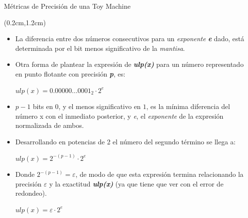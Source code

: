 \documentclass[usenames,table,dvipsnames,aspectratio=169]{beamer}
\begin{document}
\begin{frame}{Métricas de Precisión de una Toy Machine}
 \begin{textblock*}{\textwidth}(0.2cm,1.2cm)
  \begin{itemize} [<+->]\justifying \parskip .15cm
   \item La diferencia entre dos números consecutivos para un \textit{exponente} \textit{\textbf{e}} dado, está determinada por el bit menos significativo de la \textit{mantisa}.
   \item Otra forma de plantear la expresión de \textit{\textbf{ulp(x)}} para un número representado en punto flotante con precisión \textbf{\textit{p}}, es:

    \centering $ulp(x) = 0.00000 \dots 0001_{2}\cdot 2^{e}$

    \item $p-1$ bits en $0$, y el menos significativo en $1$, es la mínima diferencia del número x con el inmediato posterior, y  \textit{e}, el \textit{exponente} de la expresión normalizada de ambos.
    \item Desarrollando en potencias de 2 el número del segundo término se llega a:

    \centering $ulp(x) = 2^{-(p-1)}\cdot 2^{e}$

    \item Donde $2^{-(p-1)} = \varepsilon$, de modo de que esta expresión termina relacionando la precisión $\varepsilon$ y la exactitud \textbf{\textit{ulp(x)}} (ya que tiene que ver con el error de redondeo).

    \centering $ulp(x) = \varepsilon \cdot 2^{e}$

  \end{itemize}
 \end{textblock*}
\end{frame}
\end{document}
